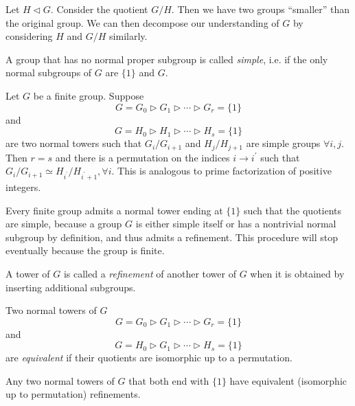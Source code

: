 \documentclass{article}
\begin{document}
Let $H \triangleleft G$. Consider the quotient $G / H$. Then we have
two groups ``smaller'' than the original group. We can then decompose
our understanding of $G$ by considering $H$ and $G/H$ similarly.

\begin{defn}
A group that has no normal proper subgroup is called \emph{simple},
i.e. if the only normal subgroups of $G$ are $\{1\}$ and $G$.
\end{defn}

\begin{theorem}
Let $G$ be a finite group. Suppose 
$$
G = G_0 \triangleright G_1 
        \triangleright \cdots
        \triangleright G_r = \{1\}
$$
and
$$
G = H_0 \triangleright H_1 
        \triangleright \cdots
        \triangleright H_s = \{1\}
$$
are two normal towers such that
$G_i / G_{i+1}$ and $H_j / H_{j+1}$ are simple groups
$\forall i, j$. Then $r = s$ and there is a permutation
on the indices $i \to i^\prime$ such that
$G_i / G_{i+1} \simeq H_{i^\prime} / H_{i^\prime + 1}, \forall
i$. This is analogous to prime factorization of positive integers.
\end{theorem}

\begin{remark}
Every finite group admits a normal tower ending at $\{ 1 \}$ such that
the quotients are simple, because a group $G$ is either simple itself
or has a nontrivial normal subgroup by definition, and thus admits a
refinement. This procedure will stop eventually because the group is finite.
\end{remark}

\begin{defn}[Refinement]
A tower of $G$ is called a \emph{refinement} of another tower of $G$
when it is obtained by inserting additional subgroups.
\end{defn}

\begin{defn}
Two normal towers of $G$ 
$$
G = G_0 \triangleright G_1 
        \triangleright \cdots
        \triangleright G_r = \{1\}
$$
and
$$
G = H_0 \triangleright G_1 
        \triangleright \cdots
        \triangleright H_s = \{1\}
$$
are \emph{equivalent} if their quotients are isomorphic up to a permutation.
\end{defn}

\begin{theorem}[Schreier]
Any two normal towers of $G$ that both end with $\{1\}$ have
equivalent (isomorphic up to permutation) refinements.
\end{theorem}
\end{document}
